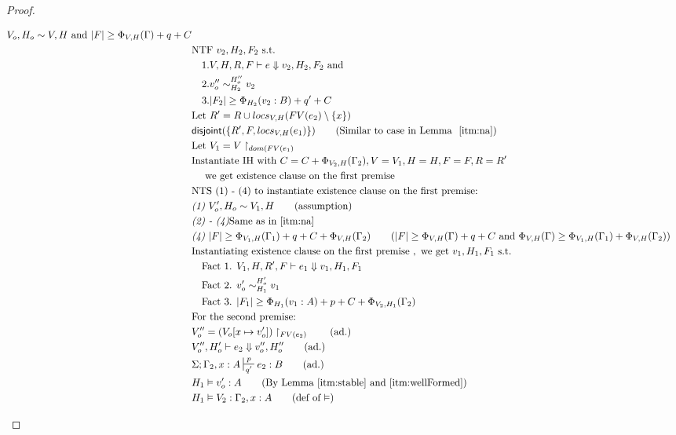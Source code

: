 \documentclass[11pt]{article}
\newcommand{\dist}[1]{\mathsf{disjoint}(#1)}
\newcommand{\veq}[4]{#3 \sim^{#1}_{#2} #4}
\theoremstyle{definition}
\begin{document}
\begin{proof}
\begin{description}
\begin{align*}
		V_o,H_o \sim V,H
			\text{ and }|F| \ge \Phi_{V,H}(\Gamma) + q + C\\
  &\text{NTF } v_2,H_2,F_2 \text{ s.t. }\\
  &\quad 1. V,H,R,F \vdash e \Downarrow v_2, H_2,F_2 \text{ and }\\ 
	&\quad 2. \veq{H_o''}{H_2}{v_o''}{v_2}\\
  &\quad 3. |F_2| \ge \Phi_{H_2}(v_2:B) + q' + C\\
	&\text{Let } R' = R \cup locs_{V,H}(FV(e_2) \setminus \{x\})\\
  &\dist{\{R',F,locs_{V,H}(e_1)\}} \tag{Similar to case in Lemma $~\ref{itm:na}$}\\
	&\text{Let } V_1 = V\restriction_{dom(FV(e_1)}\\
  &\text{Instantiate IH with } C = C + \Phi_{V_2,H}(\Gamma_2), V = V_1, H = H, F = F, R = R'\\ 
	&\quad\text{ we get existence clause on the first premise }\\
  &\text{NTS (1) - (4) to instantiate existence clause on the first premise: } \\
	&\emph{(1) } V_o',H_o \sim V_1, H \tag{assumption}\\
		&\emph{(2) - (4)} \text{Same as in \ref{itm:na}}\\
  &\emph{(4) } |F| \ge \Phi_{V_1,H}(\Gamma_1) + q + C + \Phi_{V,H}(\Gamma_2) \tag{$|F| \ge \Phi_{V,H}(\Gamma) + q + C$ and $\Phi_{V,H}(\Gamma) \ge \Phi_{V_1,H}(\Gamma_1) + \Phi_{V,H}(\Gamma_2)$}\\
  &\text{Instantiating existence clause on the first premise } , \text{ we get } 
		v_1,H_1,F_1 \text{ s.t. }\\
		&\quad \text{Fact 1. } V_1,H,R',F \vdash e_1 \Downarrow v_1, H_1,F_1\\
		&\quad \text{Fact 2. } \veq{H_o'}{H_1}{v_o'}{v_1}\\
		&\quad \text{Fact 3. } |F_1| \ge \Phi_{H_1}(v_1:A) + p + C + \Phi_{V_2,H_1}(\Gamma_2)\\
  &\text{For the second premise: }\\
	&V_o'' = (V_o[x \mapsto v_o'])\restriction_{FV(e_2)} \tag{ad.}\\
  &V_o'',H_o' \vdash e_2 \Downarrow v_o'',H_o'' \tag{ad.}\\
  &\Sigma; \Gamma_2, x : A \sststile{q'}{p} e_2 : B \tag{ad.}\\
	&H_1 \vDash v_o' : A \tag{By Lemma~\ref{itm:stable} and~\ref{itm:wellFormed}}\\ 
  &H_1 \vDash V_2 : \Gamma_2, x : A \tag{def of $\vDash$}\\

\end{align*}
\end{description}
\end{proof}
\end{document}
